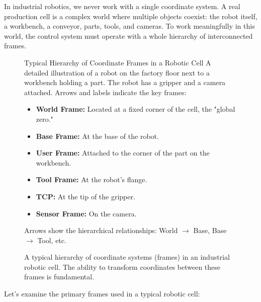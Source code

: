 In industrial robotics, we never work with a single coordinate system. A real production cell is a complex world where multiple objects coexist: the robot itself, a workbench, a conveyor, parts, tools, and cameras. To work meaningfully in this world, the control system must operate with a whole hierarchy of interconnected frames.

\begin{figure}[h!]
    \centering
        \begin{infobox}{Typical Hierarchy of Coordinate Frames in a Robotic Cell}
        A detailed illustration of a robot on the factory floor next to a workbench holding a part. The robot has a gripper and a camera attached. Arrows and labels indicate the key frames:
        \begin{itemize}
            \item \textbf{World Frame:} Located at a fixed corner of the cell, the "global zero."
            \item \textbf{Base Frame:} At the base of the robot.
            \item \textbf{User Frame:} Attached to the corner of the part on the workbench.
            \item \textbf{Tool Frame:} At the robot's flange.
            \item \textbf{TCP:} At the tip of the gripper.
            \item \textbf{Sensor Frame:} On the camera.
        \end{itemize}
        Arrows show the hierarchical relationships: World $\rightarrow$ Base, Base $\rightarrow$ Tool, etc.
    \end{infobox}
    \caption{A typical hierarchy of coordinate systems (frames) in an industrial robotic cell. The ability to transform coordinates between these frames is fundamental.}
    \label{fig:frame_hierarchy}
\end{figure}

Let's examine the primary frames used in a typical robotic cell:

